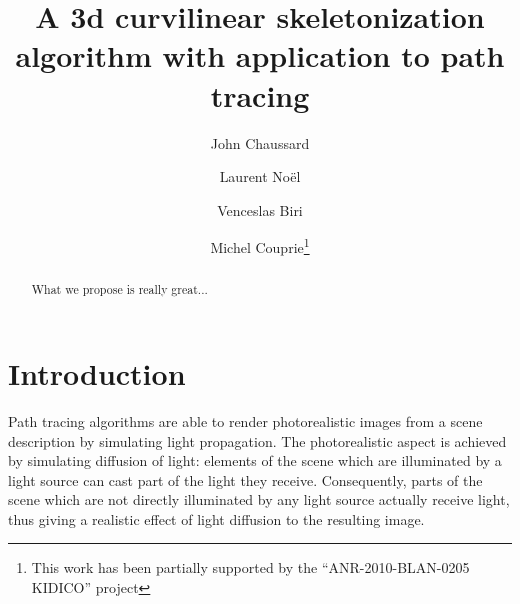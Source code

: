 \documentclass[final,envcountsame]{llncs}
\def\quotes#1{``#1''}
\begin{document}
\mainmatter

\title{A 3d curvilinear skeletonization algorithm with application to path tracing}
\author{John Chaussard \and Laurent No\"{e}l \and Venceslas Biri \and Michel Couprie\thanks{This work has been partially supported by the \quotes{ANR-2010-BLAN-0205 KIDICO} project}}


\maketitle


\begin{abstract}
What we propose is really great...
\end{abstract}



\section{Introduction}
\label{sec::intro}
Path tracing algorithms are able to render photorealistic images from a scene description by simulating light propagation. The photorealistic aspect is achieved by simulating diffusion of light: elements of the scene which are illuminated by a light source can cast part of the light they receive. Consequently, parts of the scene which are not directly illuminated by any light source actually receive light, thus giving a realistic effect of light diffusion to the resulting image. 
\end{document}
